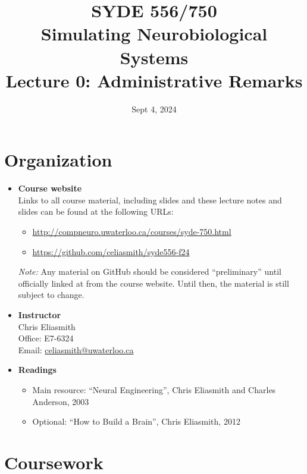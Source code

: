 \documentclass[10pt,letterpaper,oneside]{article}
\date{Sept 4, 2024}
\title{SYDE 556/750 \\ Simulating Neurobiological Systems \\ Lecture 0: Administrative Remarks}
\begin{document}

\section{Organization}

\begin{itemize}
	\item \textbf{Course website}\\
		  Links to all course material, including slides and these lecture notes and slides can be found at the following URLs:
		  \begin{itemize}
		  	\item \url{http://compneuro.uwaterloo.ca/courses/syde-750.html}
		  	\item \url{https://github.com/celiasmith/syde556-f24}
		  \end{itemize}
		  \emph{Note:} Any material on GitHub should be considered \enquote{preliminary} until officially linked at from the course website. Until then, the material is still subject to change.
	\item \textbf{Instructor}\\
		  Chris Eliasmith\\
		  Office: E7-6324\\
		  Email: \url{celiasmith@uwaterloo.ca}

	\item \textbf{Readings}
		\begin{itemize}
			\item Main resource: \enquote{Neural Engineering}, Chris Eliasmith and Charles Anderson, 2003 \cite{eliasmith2003neural}
			\item Optional: \enquote{How to Build a Brain}, Chris Eliasmith, 2012 \cite{eliasmith2013how}
		\end{itemize}
\end{itemize}

\newpage

\section{Coursework}
\end{document}
